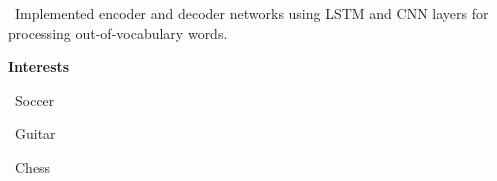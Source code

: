 \documentclass{article}
\begin{document}
\begin{minipage}[t][0pt]{8in\linewidth}
\begin{minipage}[t]{3.1in\linewidth\hspace{2.8em}}
\begin{minipage}[t]{3.3in\textwidth\hspace{0in}}
            \vspace{0.4em}
            \hspace{1em}\textasteriskcentered \, \mdseries\textrm{Implemented encoder and decoder networks using LSTM and CNN layers for processing out-of-vocabulary words.}
        \end{minipage}
    
    \begin{minipage}[t]{3.75in\textwidth\hspace{0in}}
        \vspace{1em}
        \large\mdseries\bfseries{Interests}            
        
        \small\mdseries
        \vspace{0.3em}
        \hspace{0.3em}\textasteriskcentered \, \small\mdseries\textrm{Soccer}

        \vspace{0.3em}
        \hspace{0.3em}\textasteriskcentered \, \small\mdseries\textrm{Guitar}        
        
        \vspace{0.3em}
        \hspace{0.3em}\textasteriskcentered \, \small\mdseries\textrm{Chess}

    \end{minipage}

\end{minipage}


\end{minipage}
\end{document}
